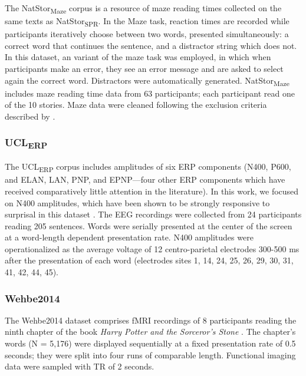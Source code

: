\documentclass[11pt]{article}
\begin{document}
The NatStor\textsubscript{Maze} corpus \citep{boyce2023maze} is a resource of maze reading times collected on the same texts as NatStor\textsubscript{SPR}. In the Maze task, reaction times are recorded while participants iteratively choose between two words, presented simultaneously: a correct word that continues the sentence, and a distractor string which does not. In this dataset, an  variant of the maze task was employed, in which when participants make an error, they see an error message and are asked to select again the correct word. Distractors were automatically generated. NatStor\textsubscript{Maze} includes maze reading time data from 63 participants; each participant read one of the 10 stories. Maze data were cleaned following the exclusion criteria described by \citet{boyce2023maze}.

\subsubsection{UCL\textsubscript{ERP}}

The UCL\textsubscript{ERP} corpus \citep{n400} includes amplitudes of six ERP components (N400, P600, and ELAN, LAN, PNP, and EPNP---four other ERP components which have received comparatively little attention in the literature). In this work, we focused on N400 amplitudes, which have been shown to be strongly responsive to surprisal in this dataset \citep{n400, de2024cloze}. The EEG recordings were collected from 24 participants reading 205 sentences. Words were serially presented at the center of the screen at a word-length dependent presentation rate. N400 amplitudes were operationalized as the average voltage of 12 centro-parietal electrodes 300-500 ms after the presentation of each word (electrodes sites 1, 14, 24, 25, 26, 29, 30, 31, 41, 42, 44, 45).

\subsubsection{Wehbe2014}

The Wehbe2014 dataset \citep{hp_fmri} comprises fMRI recordings of 8
participants reading the ninth chapter of the book \textit{Harry Potter and the Sorceror’s Stone} \citep{rowling2000and}. The chapter's words (N = 5,176) were displayed sequentially at a fixed presentation rate of 0.5 seconds; they were split into four runs of comparable length. Functional imaging data were sampled with TR of 2 seconds. 
\end{document}

